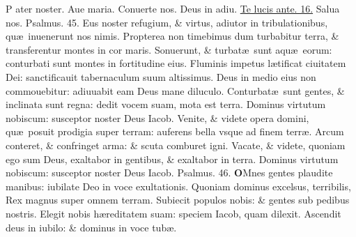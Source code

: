 \documentclass[a5paper,10pt]{book}
\def\ae{æ}
\begin{document}
\begin{multicols*}{2}
\par \noindent \color{red} P\color{black} ater noster. Aue maria. Conuerte nos. Deus in adiu. \hyperlink{Telucis}{Te lucis ante. 16.} Salua nos. \color{red} Psalmus. \hypertarget{ps45}{45.} \color{black}
Eus noster refugium, \& virtus, adiutor in tribulationibus, qu\ae \ inuenerunt nos nimis.
\newline \color{red} P\color{black}ropterea non timebimus dum turbabitur terra, \& transferentur montes in cor maris.
\newline \color{red} S\color{black}onuerunt, \& turbat\ae \ sunt aqu\ae \ eorum: conturbati sunt montes in fortitudine eius.
\newline \color{red} F\color{black}luminis impetus l\ae tificat ciuitatem Dei: sanctificauit tabernaculum suum altissimus.
\newline \color{red} D\color{black}eus in medio eius non commouebitur: adiuuabit eam Deus mane diluculo.
\newline \color{red} C\color{black}onturbat\ae \ sunt gentes, \& inclinata sunt regna: dedit vocem suam, mota est terra.
\newline \color{red} D\color{black}ominus virtutum nobiscum: susceptor noster Deus Iacob.
\newline \color{red} V\color{black}enite, \& videte opera domini, qu\ae \ posuit prodigia super terram: auferens bella vsque ad finem terr\ae .
\newline \color{red} A\color{black}rcum conteret, \& confringet arma: \& scuta comburet igni.
\newline \color{red} V\color{black}acate, \& videte, quoniam ego sum Deus, exaltabor in gentibus, \& exaltabor in terra.
\newline \color{red} D\color{black}ominus virtutum nobiscum: susceptor noster Deus Iacob. \quad \color{red} Psalmus. \hypertarget{ps46}{46.} \color{black}
\vspace{-1.5em}
\lettrine[lines=2]{\bfseries \color{red} O}{}Mnes gentes plaudite manibus: iubilate Deo in voce exultationis.
\newline \color{red} Q\color{black}uoniam dominus excelsus, terribilis, Rex magnus super omnem terram.
\newline \color{red} S\color{black}ubiecit populos nobis: \& gentes sub pedibus nostris.
\newline \color{red} E\color{black}legit nobis h\ae reditatem suam: speciem Iacob, quam dilexit.
\newline \color{red} A\color{black}scendit deus in iubilo: \& dominus in voce tub\ae .

\end{multicols*}
\end{document}
